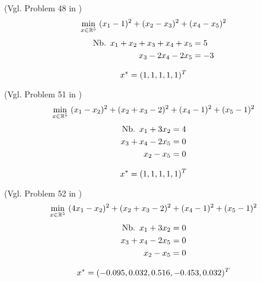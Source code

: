 \begin{testproblem}
(Vgl. Problem 48 in \cite[S.~71]{hock})
\begin{equation}
\min_{x\in\mathbb{R}^5}\ (x_1 - 1)^2 + (x_2 - x_3)^2 + (x_4 - x_5)^2
\end{equation}
\begin{equation*}
\begin{split}
\nb x_1 + x_2 + x_3 + x_4 + x_5 & = 5 \\
x_3 - 2 x_4 - 2 x_5 & = -3 \\
\end{split}
\end{equation*}

\begin{equation*}
x^* = (1, 1, 1, 1, 1)^T
\end{equation*}
\end{testproblem}

\begin{testproblem}
(Vgl. Problem 51 in \cite[S.~74]{hock})
\begin{equation}
\min_{x\in\mathbb{R}^5}\ (x_1 - x_2)^2 + (x_2 + x_3 - 2)^2 + (x_4 - 1)^2 + (x_5 - 1)^2
\end{equation}
\begin{equation*}
\begin{split}
\nb x_1 + 3 x_2 & = 4 \\
x_3 + x_4 - 2 x_5 & = 0 \\
x_2 - x_5 & = 0 \\
\end{split}
\end{equation*}

\begin{equation*}
x^* = (1, 1, 1, 1, 1)^T
\end{equation*}
\end{testproblem}

\begin{testproblem}
(Vgl. Problem 52 in \cite[S.~75]{hock})
\begin{equation}
\min_{x\in\mathbb{R}^5}\ (4 x_1 - x_2)^2 + (x_2 + x_3 - 2)^2 + (x_4 - 1)^2 + (x_5 - 1)^2
\end{equation}
\begin{equation*}
\begin{split}
\nb x_1 + 3 x_2 & = 0 \\
x_3 + x_4 - 2 x_5 & = 0 \\
x_2 - x_5 & = 0 \\
\end{split}
\end{equation*}

\begin{equation*}
x^* = (-0.095, 0.032, 0.516, -0.453, 0.032)^T
\end{equation*}
\end{testproblem}

